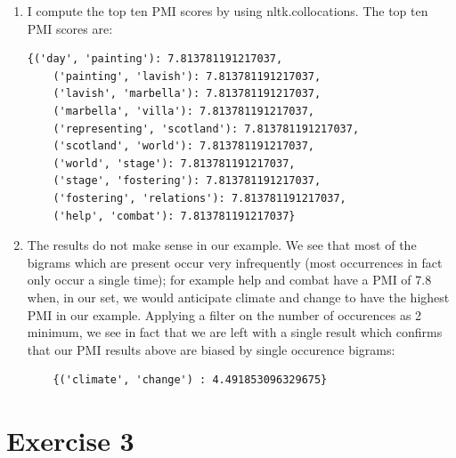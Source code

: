 \documentclass{article}
\begin{document}
\begin{enumerate}
	\item I compute the top ten PMI scores by using nltk.collocations. The top ten PMI scores are:
	\begin{verbatim}
{('day', 'painting'): 7.813781191217037,
	('painting', 'lavish'): 7.813781191217037,
	('lavish', 'marbella'): 7.813781191217037,
	('marbella', 'villa'): 7.813781191217037,
	('representing', 'scotland'): 7.813781191217037,
	('scotland', 'world'): 7.813781191217037,
	('world', 'stage'): 7.813781191217037,
	('stage', 'fostering'): 7.813781191217037,
	('fostering', 'relations'): 7.813781191217037,
	('help', 'combat'): 7.813781191217037}
	\end{verbatim}
\item The results do not make sense in our example. We see that most of the bigrams which are present occur very infrequently (most occurrences in fact only occur a single time); for example help and combat have a PMI of 7.8 when, in our set, we would anticipate climate and change to have the highest PMI in our example. Applying a filter on the number of occurences as 2 minimum, we see in fact that we are left with a single result which confirms that our PMI results above are biased by single occurence bigrams:
\begin{verbatim}
	{('climate', 'change') : 4.491853096329675}
\end{verbatim}

\end{enumerate}

\section{Exercise 3}
\end{document}
